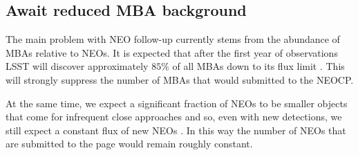 \documentclass[twocolumn]{aastex631}
\begin{document}
\subsection{Await reduced MBA background}
The main problem with NEO follow-up currently stems from the abundance of MBAs relative to NEOs. It is expected that after the first year of observations LSST will discover approximately $85\%$ of all MBAs down to its flux limit \citep{Juric+2020}. This will strongly suppress the number of MBAs that would submitted to the NEOCP.

At the same time, we expect a significant fraction of NEOs to be smaller objects that come for infrequent close approaches and so, even with new detections, we still expect a constant flux of new NEOs \citep{Juric+2020}. In this way the number of NEOs that are submitted to the page would remain roughly constant.

\end{document}
